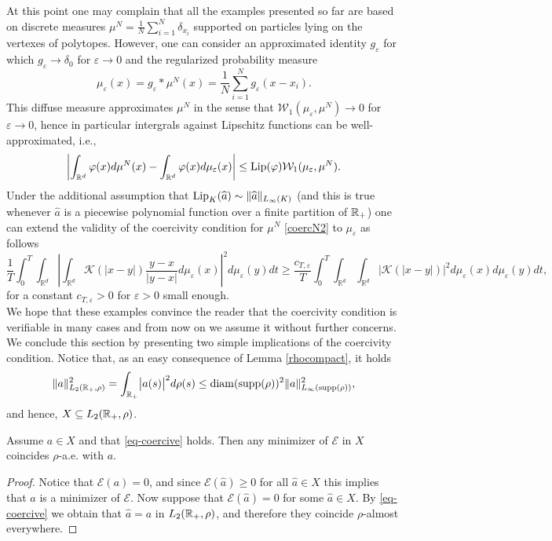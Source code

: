 At this point one may complain that all the examples presented so far are based on discrete measures $\mu^N=\frac{1}{N} \sum_{i=1}^N\delta_{x_i}$ supported on particles lying on the vertexes of polytopes. However, one can consider an approximated identity $g_\varepsilon$ for which $g_\varepsilon \to \delta_0$ for $\varepsilon \to 0$ and  the regularized probability measure
$$
\mu_\varepsilon(x) = g_\varepsilon * \mu^N (x)= \frac{1}{N} \sum_{i=1}^N g_\varepsilon (x-x_i).
$$
This diffuse measure approximates $\mu^N$ in the sense that $\mathcal W_1(\mu_\varepsilon,\mu^N) \to 0$ for $\varepsilon \to 0$, hence in particular intergrals against Lipschitz functions can be well-approximated, i.e.,
$$
\left | \int_{\mathbb R^d} \varphi(x) d \mu^N(x) -\int_{\mathbb R^d}  \varphi(x) d \mu_\varepsilon(x) \right | \leq \textup{Lip}(\varphi) \mathcal W_1(\mu_\varepsilon,\mu^N) .
$$
Under the additional assumption that $\textup{Lip}_K(\widehat a) \sim \| \widehat a \|_{L_\infty(K)}$ (and this is true whenever $\widehat a$ is a piecewise polynomial function over a finite partition of $\mathbb{R}_+$) one can extend the validity of the coercivity condition for $\mu^N$ \eqref{coercN2} 
to $\mu_\varepsilon$ as follows
$$
\frac{1}{T} \int_0^T \int_{\mathbb R^d}  \left | \int_{\mathbb R^d}  \mathcal K(|x-y|) \frac{y-x}{|y-x|} d \mu_\varepsilon(x) \right |^2 d\mu_\varepsilon(y) dt \geq \frac{c_{T,\varepsilon }}{T} \int_0^T  \int_{\mathbb R^d}  \int_{\mathbb R^d}  |\mathcal K(|x-y|)|^2    d\mu_\varepsilon(x) d\mu_\varepsilon(y)dt,
$$
for a constant $c_{T,\varepsilon }>0$ for $\varepsilon>0$ small enough.
\\

We hope that these examples convince the reader that the coercivity condition is verifiable in many cases and from now on we assume it without further concerns. We conclude this section by presenting two simple implications of the coercivity condition.
Notice that, as an easy consequence of Lemma \ref{rhocompact}, it holds
\begin{align}\label{eq:inftyimplyl2}
\|a\|^2_{L_2(\mathbb{R}_+,\rho)} = \int_{\mathbb{R}_+} \bigl|a(s)\bigr|^2 d\rho(s) \leq \operatorname{diam}(\operatorname{supp}(\rho))^2\|a\|^2_{L_{\infty}(\operatorname{supp}(\rho))},
\end{align}
and hence, $X\subseteq L_2(\mathbb{R}_+,\rho)$. 

\begin{proposition}\label{uniquemin}
Assume $a \in X$ and that \eqref{eq-coercive} holds. Then any minimizer of $\mathcal E$ in $X$ coincides $\rho$-a.e. with $a$.
\end{proposition}
\begin{proof}
Notice that $\mathcal E(a)=0$, and since $\mathcal E(\widehat a)\geq 0$ for all $\widehat a\in X$ this implies that $a$ is a minimizer of $\mathcal E$. Now suppose that $ \mathcal E(\widehat a)=0$ for some $\widehat a\in X$. By \eqref{eq-coercive} we obtain that $\widehat a=a$ in $L_2(\mathbb{R}_+,\rho)$, and therefore they coincide $\rho$-almost everywhere. %
\end{proof}
